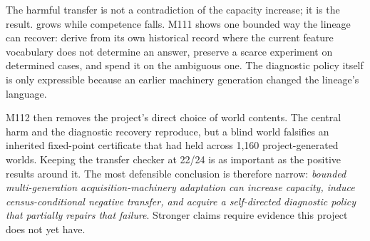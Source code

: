 The harmful transfer is not a contradiction of the capacity increase; it is the result. \reach grows while competence falls. M111 shows one bounded way the lineage can recover: derive from its own historical record where the current feature vocabulary does not determine an answer, preserve a scarce experiment on determined cases, and spend it on the ambiguous one. The diagnostic policy itself is only expressible because an earlier machinery generation changed the lineage's language.

M112 then removes the project's direct choice of world contents. The central harm and the diagnostic recovery reproduce, but a blind world falsifies an inherited fixed-point certificate that had held across 1,160 project-generated worlds. Keeping the transfer checker at 22/24 is as important as the positive results around it. The most defensible conclusion is therefore narrow: \emph{bounded multi-generation acquisition-machinery adaptation can increase capacity, induce census-conditional negative transfer, and acquire a self-directed diagnostic policy that partially repairs that failure}. Stronger claims require evidence this project does not yet have.

\appendix
